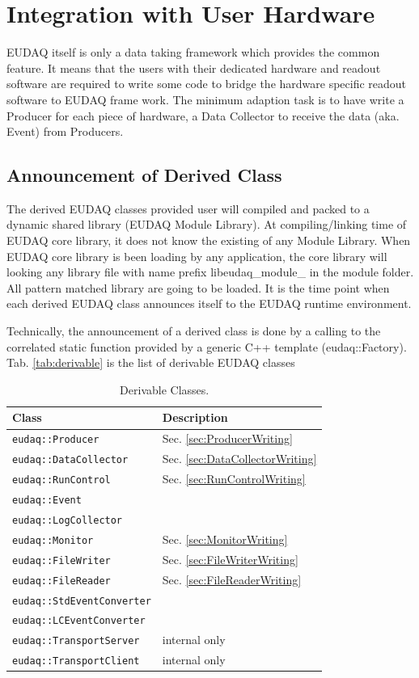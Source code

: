 \section{Integration with User Hardware}\label{sec:Integration}
EUDAQ itself is only a data taking framework which provides the common feature. It means that the users with their dedicated hardware and readout software are required to write some code to bridge the hardware specific readout software to EUDAQ frame work. The minimum adaption task is to have write a Producer for each piece of hardware, a Data Collector to receive the data (aka. Event) from Producers. 

\subsection{Announcement of Derived Class}
The derived EUDAQ classes provided user will compiled and packed to a dynamic shared library (EUDAQ Module Library). At compiling/linking time of EUDAQ core library, it does not know the existing of any Module Library. When EUDAQ core library is been loading by any application, the core library will looking any library file with name prefix libeudaq\_module\_ in the module folder. All pattern matched library are going to be loaded. It is the time point when each derived EUDAQ class announces itself to the EUDAQ runtime environment.

Technically, the announcement of a derived class is done by a calling to the correlated static function provided by a generic C++ template (eudaq::Factory). Tab. \autoref{tab:derivable} is the list of derivable EUDAQ classes

\begin{table}
\centering
\small
\begin{tabular}{ l | l }
  \textbf{Class} & \textbf{Description}\\
  \hline
  \texttt{eudaq::Producer} & Sec. \ref{sec:ProducerWriting}\\
  \texttt{eudaq::DataCollector} & Sec. \ref{sec:DataCollectorWriting}\\
  \texttt{eudaq::RunControl} & Sec. \ref{sec:RunControlWriting}\\
  \texttt{eudaq::Event} &  \\
  \texttt{eudaq::LogCollector} & \\
  \texttt{eudaq::Monitor} & Sec. \ref{sec:MonitorWriting}\\
  \texttt{eudaq::FileWriter} & Sec. \ref{sec:FileWriterWriting}\\
  \texttt{eudaq::FileReader} & Sec. \ref{sec:FileReaderWriting}\\
  \texttt{eudaq::StdEventConverter} & \\
  \texttt{eudaq::LCEventConverter} & \\
  \texttt{eudaq::TransportServer} & internal only \\
  \texttt{eudaq::TransportClient} & internal only \\
\end{tabular}
\caption{Derivable Classes.}
\label{tab:derivable}
\end{table}

